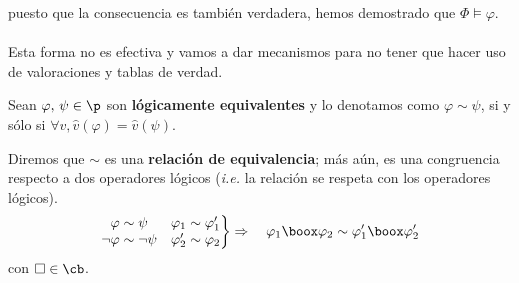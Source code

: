 puesto que la consecuencia es también verdadera, hemos demostrado que $\Phi \models \varphi$. 
\paragraph{}
Esta forma no es efectiva y vamos a dar mecanismos para no tener que hacer uso de valoraciones y tablas de verdad. 

\begin{definition} Sean $\varphi, \, \psi \in \p $ son \textbf{lógicamente equivalentes} y lo denotamos como $\varphi \sim \psi$, si y sólo si $\forall v, \widehat{v}(\varphi)=\widehat{v}(\psi)$.
\end{definition}

\begin{lemma}
Diremos que $\sim$ es una \textbf{relación de equivalencia}; más aún, es una congruencia respecto a dos operadores lógicos (\textit{i.e.} la relación se respeta con los operadores lógicos). 
\[ \left. \begin{matrix}
\varphi \sim \psi & \varphi_1 \sim \varphi'_1\\
\neg \varphi \sim \neg \psi & \varphi'_2 \sim \varphi_2 
\end{matrix} \right \rbrace  \Rightarrow \quad \varphi_1 \boox \varphi_2 \sim \varphi'_1 \boox \varphi'_2\]
con $\Box \in \cb$.
\end{lemma}

